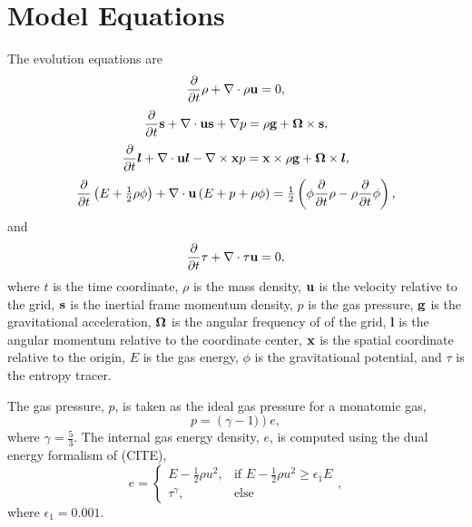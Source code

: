 \documentclass{aastex63}
\begin{document}
\newcommand{\ddt}[1]{\frac{\partial}{\partial t} #1} 
\newcommand{\divergence}[1]{{\bf \nabla} \cdot #1}
\newcommand{\curl}[1]{{\bf \nabla} \times #1}
\newcommand{\gradient}[1]{{\bf \nabla} #1}
\newcommand{\vect}[1]{{\bf #1}}
\newcommand{\am}{\bm{l}}


\section{Model Equations}
The evolution equations are
\begin{equation}
\ddt{\rho}+\divergence{\rho\vect{u}}=0,
\label{rho}
\end{equation}
\begin{equation}
\ddt{\vect{s}}+\divergence{\vect{u}\vect{s} + \gradient{p}}=\rho \vect{g} + \vect{\Omega} \times \vect{s},
\label{rhou}
\end{equation}
\begin{equation}
\ddt{\am}+\divergence{\vect{u}\am - \curl{\vect{x} p}}=\vect{x}\times\rho \vect{g} + \vect{\Omega} \times \am,
\label{am}
\end{equation}
\begin{equation}
\ddt{\left(E+\tfrac{1}{2}\rho\phi\right)}+\divergence{\vect{u}\left(E+p+\rho\phi\right)}=\tfrac{1}{2}\left(\phi\ddt{\rho}-\rho\ddt{\phi}\right),
\label{E}
\end{equation}
and
\begin{equation}
\ddt{\tau}+\divergence{\tau\vect{u}}=0,
\label{tau}
\end{equation}
where $t$ is the time coordinate, $\rho$ is the mass density, $\vect{u}$ is the velocity relative to the grid, $\vect{s}$ is the inertial frame momentum density, $p$ is the gas pressure, 
$\vect{g}$ is the gravitational acceleration, 
$\vect{\Omega}$ is the angular frequency of of the grid,
$\am$ is the angular momentum relative to the coordinate center, 
$\vect{x}$ is the spatial coordinate relative to the origin, 
$E$ is the gas energy, $\phi$ is the gravitational potential, 
and $\tau$ is the entropy tracer.

The gas pressure, $p$, is taken as the ideal gas pressure for a monatomic gas, 
\begin{equation}
p = \left( \gamma - 1 ) \right) e, 
\end{equation}
where $\gamma = \tfrac{5}{3}$. The internal gas energy density, $e$, is computed using the dual energy formalism of (CITE),
\begin{equation}
    e = 
\begin{cases}
    E - \tfrac{1}{2} \rho u^2, & \text{if } E - \tfrac{1}{2} \rho u^2 \geq \epsilon_1 E\\
    \tau^{\gamma},             & \text{else}
\end{cases},
\end{equation}
where $\epsilon_1 = 0.001$.
\end{document}
